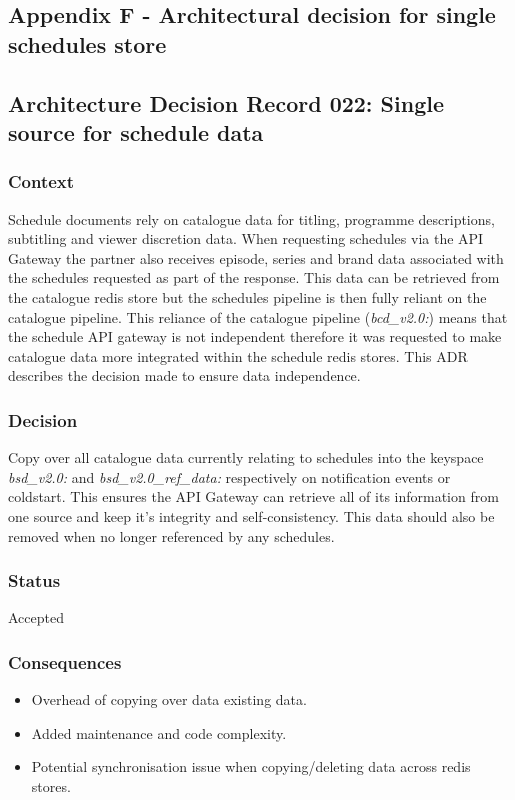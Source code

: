   \newpage
  \subsection{Appendix F - Architectural decision for single schedules store}
  \label{sec:AppendixF}

  \subsection*{Architecture Decision Record 022: Single source for schedule data}

  \subsubsection*{Context}
  Schedule documents rely on catalogue data for titling, programme descriptions, subtitling and viewer discretion data. When requesting 
  schedules via the API Gateway the partner also receives episode, series and brand data associated with the schedules requested as part of
  the response. This data can be retrieved from the catalogue redis store but the schedules pipeline is then fully reliant on the catalogue pipeline.
  This reliance of the catalogue pipeline (\emph{{bcd\_v2.0}:}) means that the schedule API gateway is not independent therefore it was requested to make 
  catalogue data more integrated within the schedule redis stores. This ADR describes the decision made to ensure data independence.
  \subsubsection*{Decision}
  Copy over all catalogue data currently relating to schedules into the keyspace \emph{{bsd\_v2.0}:} and \emph{{bsd\_v2.0\_ref\_data}:} respectively on 
  notification events or coldstart. This ensures the API Gateway can retrieve all of its information from one source and keep it's integrity and
  self-consistency. This data should also be removed when no longer referenced by any schedules.

  \subsubsection*{Status}
  Accepted

  \subsubsection*{Consequences}
    \begin{itemize}
      \item Overhead of copying over data existing data.
      \item Added maintenance and code complexity.
      \item Potential synchronisation issue when copying/deleting data across redis stores.
    \end{itemize}


